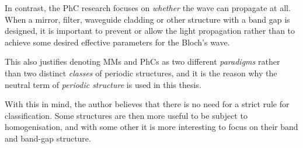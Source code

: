 In contrast, the PhC research focuses on \textit{whether} the wave can propagate at all. When a mirror, filter, waveguide cladding or other structure with a band gap is designed, it is important to prevent or allow the light propagation rather than to achieve some desired effective parameters for the Bloch's wave. 

This also justifies denoting MMs and PhCs as two different \textit{paradigms} rather than two distinct \textit{classes} of periodic structures, and it is the reason why the neutral term of \textit{periodic structure} is used in this thesis. 

With this in mind, the author believes that there is no need for a strict rule for classification. Some structures are then more useful to be subject to homogenisation, and with some other it is more interesting to focus on their band and band-gap structure. 



